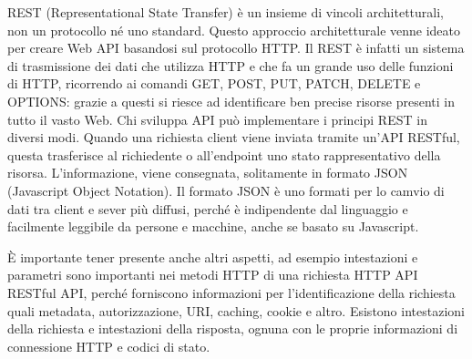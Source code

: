 \documentclass[12pt,a4paper]{article}
\begin{document}
REST (Representational State Transfer) è un insieme di vincoli architetturali, non un protocollo né uno standard. Questo approccio architetturale venne ideato per creare Web API basandosi sul protocollo HTTP. Il REST è infatti un sistema di trasmissione dei dati che utilizza HTTP e che fa un grande uso delle funzioni di HTTP, ricorrendo ai comandi GET, POST, PUT, PATCH, DELETE e OPTIONS: grazie a questi si riesce ad identificare ben precise risorse presenti in tutto il vasto Web. Chi sviluppa API può implementare i principi REST in diversi modi.
%
Quando una richiesta client viene inviata tramite un'API RESTful, questa trasferisce al richiedente o all'endpoint uno stato rappresentativo della risorsa. L'informazione, viene consegnata, solitamente in formato JSON (Javascript Object Notation). Il formato JSON è uno formati per lo camvio di dati tra client e sever più diffusi, perché è indipendente dal linguaggio e facilmente leggibile da persone e macchine, anche se basato su Javascript.

È importante tener presente anche altri aspetti, ad esempio intestazioni e parametri sono importanti nei metodi HTTP di una richiesta HTTP API RESTful API, perché forniscono informazioni per l'identificazione della richiesta quali metadata, autorizzazione, URI, caching, cookie e altro. Esistono intestazioni della richiesta e intestazioni della risposta, ognuna con le proprie informazioni di connessione HTTP e codici di stato.
\end{document}
